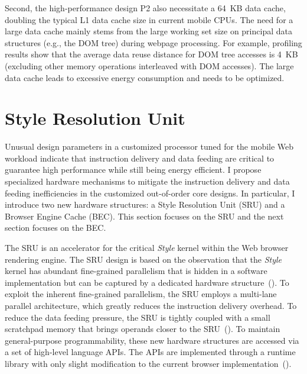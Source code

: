Second, the high-performance design P2 also necessitate a 64~KB data cache, doubling the typical L1 data cache size in current mobile CPUs. The need for a large data cache mainly stems from the large working set size on principal data structures (e.g., the DOM tree) during webpage processing. For example, profiling results show that the average data reuse distance for DOM tree accesses is 4~KB (excluding other memory operations interleaved with DOM accesses). The large data cache leads to excessive energy consumption and needs to be optimized.

\section{Style Resolution Unit}
\label{sec:arch:sru}

Unusual design parameters in a customized processor tuned for the mobile Web workload indicate that instruction delivery and data feeding are critical to guarantee high performance while still being energy efficient. I propose specialized hardware mechanisms to mitigate the instruction delivery and data feeding inefficiencies in the customized out-of-order core designs. In particular, I introduce two new hardware structures: a Style Resolution Unit (SRU) and a Browser Engine Cache (BEC). This section focuses on the SRU and the next section focuses on the BEC.

The SRU is an accelerator for the critical \textit{Style} kernel within the Web browser rendering engine. The SRU design is based on the observation that the \textit{Style} kernel has abundant fine-grained parallelism that is hidden in a software implementation but can be captured by a dedicated hardware structure~(). To exploit the inherent fine-grained parallelism, the SRU employs a multi-lane parallel architecture, which greatly reduces the instruction delivery overhead. To reduce the data feeding pressure, the SRU is tightly coupled with a small scratchpad memory that brings operands closer to the SRU~(). To maintain general-purpose programmability, these new hardware structures are accessed via a set of high-level language APIs. The APIs are implemented through a runtime library with only slight modification to the current browser implementation~().


